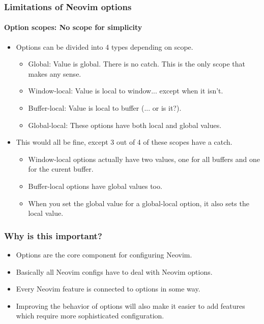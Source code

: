 \documentclass[10pt]{beamer}
\begin{document}
\begin{frame}
\frametitle{Limitations of Neovim options}
\framesubtitle{Option scopes: No scope for simplicity}
\begin{itemize}
    \item Options can be divided into 4 types depending on scope.
    \begin{itemize}
        \item Global: Value is global. There is no catch. This is the only scope that makes any sense.
        \item Window-local: Value is local to window... except when it isn't.
        \item Buffer-local: Value is local to buffer (... or is it?).
        \item Global-local: These options have both local and global values.
    \end{itemize}
    \item This would all be fine, except 3 out of 4 of these scopes have a catch.
    \begin{itemize}
        \item Window-local options actually have two values, one for all buffers and one for the
            curent buffer.
        \item Buffer-local options have global values too.
        \item When you set the global value for a global-local option, it also sets the local value.
    \end{itemize}
\end{itemize}
\end{frame}
\begin{frame}
\frametitle{Why is this important?}
\begin{itemize} 
    \item Options are the core component for configuring Neovim.
    \item Basically all Neovim configs have to deal with Neovim options.
    \item Every Neovim feature is connected to options in some way.
    \item Improving the behavior of options will also make it easier to add features which require
        more sophisticated configuration.
\end{itemize}
\end{frame}

\lstset{style=c_style}
\end{document}
